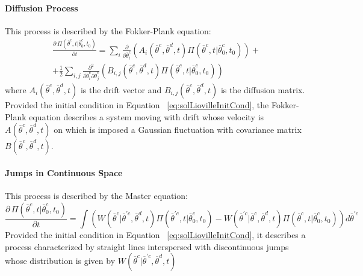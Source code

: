 \paragraph{Diffusion Process}
\label{subsec:CKDiffusion}
This process is described by the Fokker-Plank equation:
\begin{equation}
\begin{matrix}
\frac{\partial \, \Pi \left (\overline{\theta}^{c},t|\overline{\theta}^{c}_{0},t_{0}  \right ) }{\partial t} = 
\sum_{i}\frac{\partial }{\partial \overline{\theta}^{c}_{i}}\left ( A_{i}\left ( \overline{\theta}^{c},\overline{\theta}^{d},t \right ) \Pi \left (\overline{\theta}^{c},t|\overline{\theta}^{c}_{0},t_{0}  \right ) \right ) +
\\
+ \frac{1}{2}\sum_{i,j} \frac{\partial^2 }{\partial \overline{\theta}^{c}_{i} \partial \overline{\theta}^{c}_{j}}\left ( B_{i,j}\left (  \overline{\theta}^{c}, \overline{\theta}^{d}, t\right ) \Pi \left (\overline{\theta}^{c},t|\overline{\theta}_{0}^{c},t_{0}  
\right )  \right ) 
\end{matrix}
\end{equation}
where $A_{i}\left ( \overline{\theta}^{c},\overline{\theta}^{d},t \right )$ is the drift vector and $B_{i,j}\left (  \overline{\theta}^{c}, \overline{\theta}^{d}, t\right ) $  is the diffusion matrix. 
\\Provided the initial condition in Equation ~\ref{eq:solLiovilleInitCond}, the Fokker-Plank equation describes a system moving with drift whose velocity is 
 $A\left ( \overline{\theta}^{c},\overline{\theta}^{d},t \right )$ on which is imposed a Gaussian fluctuation with covariance matrix $B\left (  \overline{\theta}^{c}, \overline{\theta}^{d}, t\right ) $.
%
%
%
%
\paragraph{Jumps in Continuous Space }
\label{subsec:CKJumpsCont}
This process is described by the Master equation:
\begin{equation}
\frac{\partial \, \Pi \left (\overline{\theta}^{c},t|\overline{\theta}^{c}_{0},t_{0}  \right ) }{\partial t} =  \int \left (  W\left ( \overline{\theta}^{c}|
\overline{\theta}^{'c},\overline{\theta}^{d},t \right )\Pi \left (\overline{\theta}^{'c},t|\overline{\theta}_{0}^{c},t_{0}  
\right ) - W\left ( \overline{\theta}^{'c}|
\overline{\theta}^{c},\overline{\theta}^{d},t \right )\Pi \left (\overline{\theta}^{c},t|\overline{\theta}_{0}^{c},t_{0}  
\right )  \right )d\overline{\theta}^{'c}
\end{equation}
Provided the initial condition  in Equation ~\ref{eq:solLiovilleInitCond}, it describes a process characterized by 
straight lines interspersed with discontinuous jumps whose distribution is given by $W\left ( \overline{\theta}^{c}|
\overline{\theta}^{'c},\overline{\theta}^{d},t \right )$


